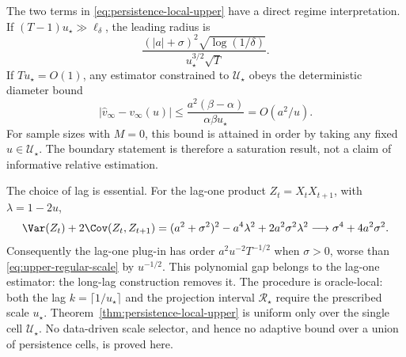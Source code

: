 The two terms in \eqref{eq:persistence-local-upper} have a direct regime
interpretation.  If
\((T-1)u_\star\gg\ell_\delta\), the leading radius is
\begin{equation}
 \frac{(|a|+\sigma)^2\sqrt{\log(1/\delta)}}
 {u_\star^{3/2}\sqrt T}.
 \label{eq:upper-regular-scale}
\end{equation}
If \(Tu_\star=O(1)\), any estimator constrained to
\(\mathcal U_\star\) obeys the deterministic diameter bound
\begin{equation}
 |\widehat v_\infty-v_\infty(u)|
 \leq
 \frac{a^2(\beta-\alpha)}{\alpha\beta u_\star}
 =O(a^2/u).
 \label{eq:upper-boundary-diameter}
\end{equation}
For sample sizes with \(M=0\), this bound is attained in order by taking any
fixed \(\widehat u\in\mathcal U_\star\).  The boundary statement is therefore
a saturation result, not a claim of informative relative estimation.

The choice of lag is essential.  For the lag-one product
\(Z_t=X_tX_{t+1}\), with \(\lambda=1-2u\),
\begin{equation}
 \Var(Z_t)+2\Cov(Z_t,Z_{t+1})
 =(a^2+\sigma^2)^2-a^4\lambda^2
 +2a^2\sigma^2\lambda^2
 \longrightarrow\sigma^4+4a^2\sigma^2.
 \label{eq:upper-lag-one-lrv}
\end{equation}
Consequently the lag-one plug-in has order
\(a^2u^{-2}T^{-1/2}\) when \(\sigma>0\), worse than
\eqref{eq:upper-regular-scale} by \(u^{-1/2}\).  This polynomial gap belongs
to the lag-one estimator: the long-lag construction removes it.  The procedure
is oracle-local: both the lag \(k=\lceil1/u_\star\rceil\) and the projection
interval \(\mathcal R_\star\) require the prescribed scale \(u_\star\).
Theorem~\ref{thm:persistence-local-upper} is uniform only over the single cell
\(\mathcal U_\star\).  No data-driven scale selector, and hence no adaptive
bound over a union of persistence cells, is proved here.
